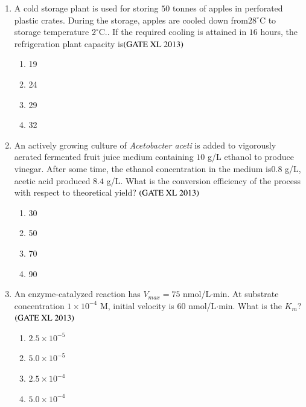 \documentclass[journal]{IEEEtran}
\begin{document}
\begin{enumerate}
\item A cold storage plant is used for storing $50$ tonnes of apples  in perforated plastic crates. During the storage, apples are cooled down from$28^{\circ}$C to storage temperature $2^{\circ}$C.. If the required cooling is attained in $16$ hours, the refrigeration plant capacity  is\hfill $\left(\text{GATE XL 2013}\right)$
\begin{enumerate}
    \item 19
    \item 24
    \item 29
    \item 32
\end{enumerate}

\item An actively growing culture of \textit{Acetobacter aceti} is added to vigorously aerated fermented fruit juice medium containing  $10$ g/L ethanol to produce vinegar. After some time, the ethanol concentration in the medium is$0.8$ g/L, acetic acid produced $8.4$ g/L. What is the conversion efficiency of the process with respect to theoretical yield? \hfill $\left(\text{GATE XL 2013}\right)$
\begin{enumerate}
    \item 30
    \item 50
    \item 70
    \item 90
\end{enumerate}

\item An enzyme-catalyzed reaction  has $V_{max} = 75$ nmol/L$\cdot$min. At substrate concentration $1 \times 10^{-4}$ M, initial velocity is $60$ nmol/L$\cdot$min. What is the $K_m$?\hfill $\left(\text{GATE XL 2013}\right)$
\begin{enumerate}
    \item $2.5 \times 10^{-5}$
    \item $5.0 \times 10^{-5}$
    \item $2.5 \times 10^{-4}$
    \item $5.0 \times 10^{-4}$
\end{enumerate}
\end{enumerate}
\end{document}
